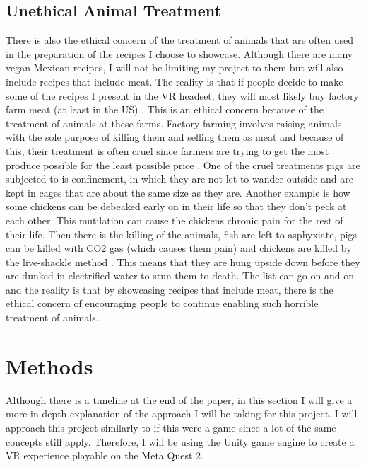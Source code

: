 \documentclass[11pt,twocolumn]{article}
\begin{document}
\subsection{Unethical Animal Treatment}
There is also the ethical concern of the treatment of animals that are often used in the preparation of the recipes I choose to showcase. Although there are many vegan Mexican recipes, I will not be limiting my project to them but will also include recipes that include meat. The reality is that if people decide to make some of the recipes I present in the VR headset, they will most likely buy factory farm meat (at least in the US) \cite{usafarming2019}. This is an ethical concern because of the treatment of animals at these farms. Factory farming involves raising animals with the sole purpose of killing them and selling them as meat and because of this, their treatment is often cruel since farmers are trying to get the most produce possible for the least possible price \cite{factoryfarms2021}. One of the cruel treatments pigs are subjected to is confinement, in which they are not let to wander outside and are kept in cages that are about the same size as they are. Another example is how some chickens can be debeaked early on in their life so that they don’t peck at each other. This mutilation can cause the chickens chronic pain for the rest of their life. Then there is the killing of the animals, fish are left to asphyxiate, pigs can be killed with CO2 gas (which causes them pain) and chickens are killed by the live-shackle method \cite{factoryfarms2021}. This means that they are hung upside down before they are dunked in electrified water to stun them to death. The list can go on and on and the reality is that by showcasing recipes that include meat, there is the ethical concern of encouraging people to continue enabling such horrible treatment of animals.


\section{Methods}
Although there is a timeline at the end of the paper, in this section I will give a more in-depth explanation of the approach I will be taking for this project. I will approach this project similarly to if this were a game since a lot of the same concepts still apply. Therefore, I will be using the Unity game engine to create a VR experience playable on the Meta Quest 2. 
\end{document}
